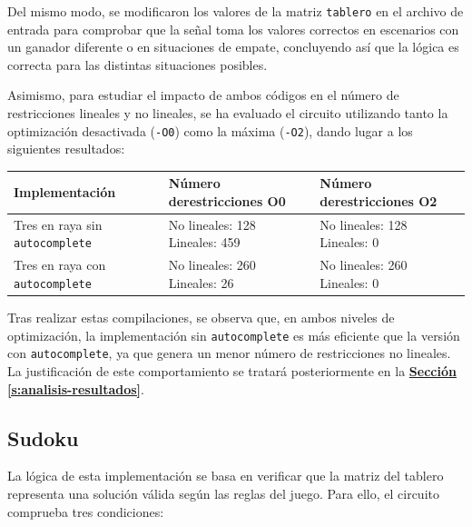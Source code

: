 \documentclass[a4paper,12pt]{report}
\begin{document}
	\vspace{0.2cm}
	\noindent Del mismo modo, se modificaron los valores de la matriz \texttt{tablero} en el archivo de entrada para comprobar que la señal toma los valores correctos en escenarios con un ganador diferente o en situaciones de empate, concluyendo así que la lógica es correcta para las distintas situaciones posibles.
	
	\vspace{0.2cm}
	\noindent Asimismo, para estudiar el impacto de ambos códigos en el número de restricciones lineales y no lineales, se ha evaluado el circuito utilizando tanto la optimización desactivada (\texttt{-O0}) como la máxima (\texttt{-O2}), dando lugar a los siguientes resultados:
	
	\vspace{0.2cm}
	\begingroup 
	\renewcommand{\arraystretch}{1.8} 
	\begin{longtable}{|>{\centering\arraybackslash}m{4.5cm}|>{\centering\arraybackslash}m{4.8cm}|>{\centering\arraybackslash}m{4.8cm}|}
		\hline
		\textbf{Implementación} & \textbf{Número de\newline restricciones O0} & \textbf{Número de\newline restricciones O2} \\
		\hline
		
		Tres en raya sin \texttt{autocomplete} & No lineales: 128 \newline Lineales: 459 & No lineales: 128 \newline Lineales: 0 \\
		\hline
		
		Tres en raya con \texttt{autocomplete} & No lineales: 260 \newline Lineales: 26 & No lineales: 260 \newline Lineales: 0 \\
		\hline
	\end{longtable}
	\endgroup
	
	\vspace{0.2cm}
	\noindent Tras realizar estas compilaciones, se observa que, en ambos niveles de optimización, la implementación sin \texttt{autocomplete} es más eficiente que la versión con \texttt{autocomplete}, ya que genera un menor número de restricciones no lineales. La justificación de este comportamiento se tratará posteriormente en la \hyperref[s:analisis-resultados]{\textbf{Sección \ref{s:analisis-resultados}}}.
	
	\subsection{Sudoku}
	\noindent La lógica de esta implementación se basa en verificar que la matriz del tablero representa una solución válida según las reglas del juego. Para ello, el circuito comprueba tres condiciones: 
	
\end{document}
